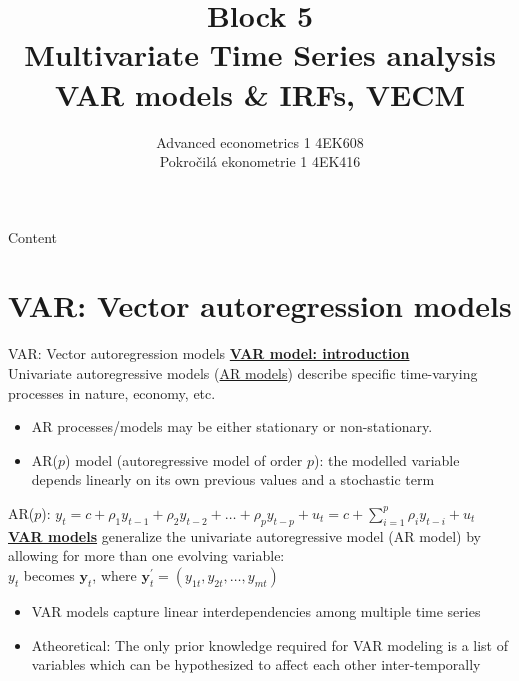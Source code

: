 \documentclass[usenames,dvipsnames]{beamer}
\title[Block 5]{Block 5\\ Multivariate Time Series analysis\\ VAR models \& IRFs, VECM}
\author{Advanced econometrics 1 4EK608 \\Pokročilá ekonometrie 1 4EK416}
\institute{Vysoká škola ekonomická v Praze}
\date{}
\begin{document}
 
\begin{frame}
  \titlepage
\end{frame}

\begin{frame}{Content}
  \tableofcontents
\end{frame}

\section{VAR: Vector autoregression models}
\begin{frame}{VAR: Vector autoregression models}
\footnotesize
\underline{\textbf{VAR model: introduction}}\\
\bigskip
Univariate autoregressive models (\underline{AR models}) describe specific time-varying processes in nature, economy, etc.
\begin{itemize}
\item AR processes/models may be either stationary or non-stationary.
\item AR($p$) model (autoregressive model of order $p$): the modelled variable depends linearly on its own previous values and a stochastic term
\end{itemize}
\medskip
AR($p$): $y_t = c + \rho_1 y_{t-1} + \rho_2 y_{t-2} + \dots + \rho_p y_{t-p} + u_t = c + \sum_{i=1}^p \rho_i y_{t-i} + u_t$ \\
\bigskip
\underline{\textbf{VAR models}} generalize the univariate autoregressive model (AR model) by allowing for more than one evolving variable:\\ $y_t$ becomes $\bm{y}_t$, where $\bm{y}_t^{\prime} = (y_{1t}, y_{2t}, \dots , y_{mt})$\\
\begin{itemize}
\item VAR models capture linear interdependencies among multiple time series 
\item Atheoretical: The only prior knowledge required for VAR modeling is a list of variables which can be hypothesized to affect each other inter-temporally
\end{itemize}
\end{frame}
\end{document}
